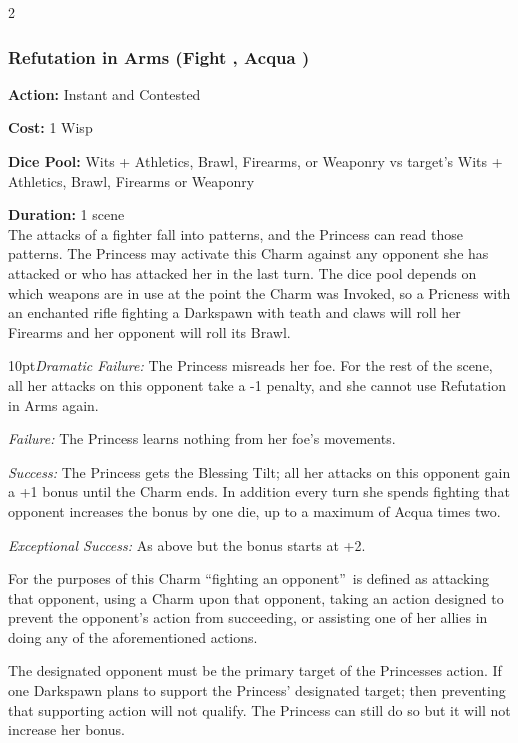\begin{multicols}{2}
\subsubsection*{Refutation in Arms (Fight \textbullet\textbullet\textbullet, Acqua \textbullet\textbullet)}

\noindent \textbf{Action:} Instant and Contested

\noindent \textbf{Cost:} 1 Wisp

\noindent \textbf{Dice Pool:} Wits + Athletics, Brawl, Firearms, or Weaponry vs target's Wits + Athletics, Brawl, Firearms or Weaponry

\noindent \textbf{Duration:} 1 scene\\

The attacks of a fighter fall into patterns, and the Princess can read those patterns. The Princess may activate this Charm against any opponent she has attacked or who has attacked her in the last turn. The dice pool depends on which weapons are in use at the point the Charm was Invoked, so a Pricness with an enchanted rifle fighting a Darkspawn with teath and claws will roll her Firearms and her opponent will roll its Brawl. 

\begin{myindentpar}{10pt}\emph{Dramatic Failure:} The Princess misreads her foe. For the rest of the scene, all her attacks on this opponent take a -1 penalty, and she cannot use Refutation in Arms again.

\emph{Failure:} The Princess learns nothing from her foe's movements.

\emph{Success:} The Princess gets the Blessing Tilt; all her attacks on this opponent gain a +1 bonus until the Charm ends. In addition every turn she spends fighting that opponent increases the bonus by one die, up to a maximum of Acqua times two. 

\emph{Exceptional Success:} As above but the bonus starts at +2.\end{myindentpar}

\noindent For the purposes of this Charm \textquotedblleft fighting an opponent\textquotedblright\, is defined as attacking that opponent, using a Charm upon that opponent, taking an action designed to prevent the opponent's action from succeeding, or assisting one of her allies in doing any of the aforementioned actions.

The designated opponent must be the primary target of the Princesses action. If one Darkspawn plans to support the Princess' designated target; then preventing that supporting action will not qualify. The Princess can still do so but it will not increase her bonus. 


\end{multicols}
